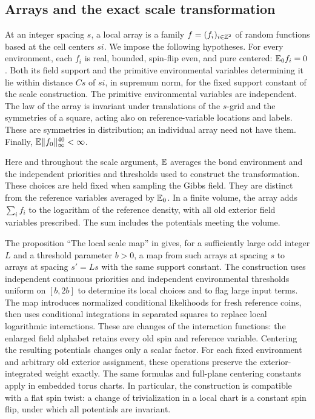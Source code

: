 \subsection{Arrays and the exact scale transformation}

At an integer spacing \(s\), a local array is a family
\(f=(f_i)_{i\in\mathbb Z^2}\) of random functions based at the cell centers
\(si\).  We impose the following hypotheses.  For every environment,
each \(f_i\) is real, bounded, spin-flip even, and pure centered:
\(\mathbb E_0 f_i=0\).  Both its field support and the primitive environmental
variables determining it lie within distance \(Cs\) of \(si\), in
supremum norm, for the fixed support constant of the scale construction.
The primitive environmental variables are independent.  The law of the
array is invariant under translations of the \(s\)-grid and the
symmetries of a square, acting also on reference-variable locations and
labels.  These are symmetries in distribution; an individual array need
not have them.  Finally, \(\mathbb E\|f_0\|_\infty^{40}<\infty\).

Here and throughout the scale argument, \(\mathbb E\) averages the bond
environment and the independent priorities and thresholds used to
construct the transformation.  These choices are held fixed when
sampling the Gibbs field.  They are distinct from the reference variables
averaged by \(\mathbb E_0\).  In a finite volume, the array adds
\(\sum_i f_i\) to the logarithm of the reference density, with all old
exterior field variables prescribed.  The sum includes the potentials
meeting the volume.

The proposition ``The local scale map'' in \cite[Section~3]{R} gives,
for a sufficiently large odd integer \(L\) and a threshold parameter
\(b>0\), a map from such arrays at spacing \(s\) to arrays at spacing
\(s'=Ls\) with the same support constant.  The construction uses
independent continuous priorities and independent environmental
thresholds uniform on \([b,2b]\) to determine its local choices and to
flag large input terms.  The map introduces normalized conditional
likelihoods for fresh reference coins, then uses conditional integrations
in separated squares to replace local logarithmic interactions.  These
are changes of the interaction functions: the enlarged field alphabet
retains every old spin and reference variable.
Centering the resulting potentials changes only a scalar factor.  For
each fixed environment and arbitrary old exterior assignment, these
operations preserve the exterior-integrated weight exactly.  The same
formulas and full-plane centering constants apply in embedded torus
charts.  In particular, the construction is compatible with a flat spin
twist: a change of trivialization in a local chart is a constant spin
flip, under which all potentials are invariant.

